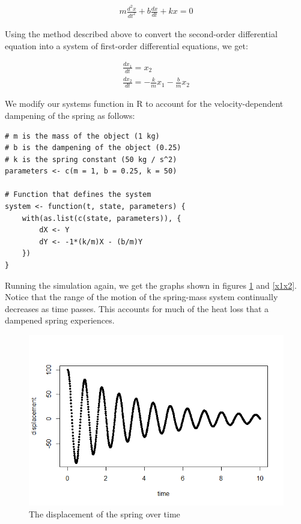 \begin{gather*}
    m\frac{d^2 x}{dt^2}+b\frac{dx}{dt}+kx=0
\end{gather*}

Using the method described above to convert the second-order differential equation into a system of first-order differential equations, we get:

\begin{gather*}
\frac{dx_1}{dt}=x_2\\
\frac{dx_2}{dt}=-\frac{k}{m}x_1 - \frac{b}{m}x_2
\end{gather*}

We modify our systems function in R to account for the velocity-dependent dampening of the spring as follows:

\begin{lstlisting}
# m is the mass of the object (1 kg)
# b is the dampening of the object (0.25)
# k is the spring constant (50 kg / s^2)
parameters <- c(m = 1, b = 0.25, k = 50)

# Function that defines the system
system <- function(t, state, parameters) {
    with(as.list(c(state, parameters)), {
        dX <- Y
        dY <- -1*(k/m)X - (b/m)Y
    })
}
\end{lstlisting}

Running the simulation again, we get the graphs shown in figures \ref{displacementtime} and \ref{x1x2}.
Notice that the range of the motion of the spring-mass system continually decreases as time passes.
This accounts for much of the heat loss that a dampened spring experiences. 

\begin{figure}[h]
    \centering
    \includegraphics[width=12cm]{pictures/diffeq/plot3.png}
    \caption{The displacement of the spring over time}
    \label{displacementtime}
\end{figure}

